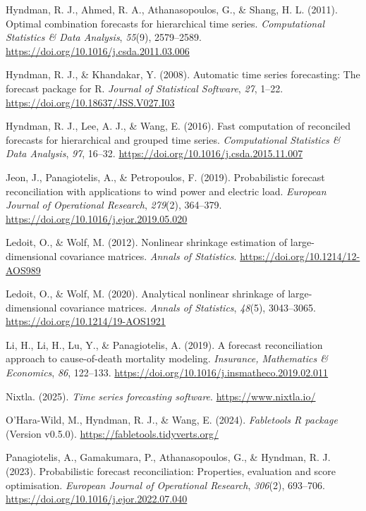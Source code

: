\documentclass[
  11pt,
  letterpaper,
  DIV=11,
  numbers=noendperiod,
  titlepage]{scrartcl}
\newlength{\cslhangindent}
\newenvironment{CSLReferences}[2] %
 {\begin{list}{}{%
  \setlength{\itemindent}{0pt}
  \setlength{\leftmargin}{0pt}
  \setlength{\parsep}{0pt}
  \ifodd #1
   \setlength{\leftmargin}{\cslhangindent}
   \setlength{\itemindent}{-1\cslhangindent}
  \fi
  \setlength{\itemsep}{#2\baselineskip}}}
 {\end{list}}
\begin{document}
\begin{CSLReferences}{1}{0}
Hyndman, R. J., Ahmed, R. A., Athanasopoulos, G., \& Shang, H. L.
(2011). Optimal combination forecasts for hierarchical time series.
\emph{Computational Statistics \& Data Analysis}, \emph{55}(9),
2579--2589. \url{https://doi.org/10.1016/j.csda.2011.03.006}

Hyndman, R. J., \& Khandakar, Y. (2008). Automatic time series
forecasting: The forecast package for {R}. \emph{Journal of Statistical
Software}, \emph{27}, 1--22. \url{https://doi.org/10.18637/JSS.V027.I03}

Hyndman, R. J., Lee, A. J., \& Wang, E. (2016). Fast computation of
reconciled forecasts for hierarchical and grouped time series.
\emph{Computational Statistics \& Data Analysis}, \emph{97}, 16--32.
\url{https://doi.org/10.1016/j.csda.2015.11.007}

Jeon, J., Panagiotelis, A., \& Petropoulos, F. (2019). Probabilistic
forecast reconciliation with applications to wind power and electric
load. \emph{European Journal of Operational Research}, \emph{279}(2),
364--379. \url{https://doi.org/10.1016/j.ejor.2019.05.020}

Ledoit, O., \& Wolf, M. (2012). Nonlinear shrinkage estimation of
large-dimensional covariance matrices. \emph{Annals of Statistics}.
\url{https://doi.org/10.1214/12-AOS989}

Ledoit, O., \& Wolf, M. (2020). Analytical nonlinear shrinkage of
large-dimensional covariance matrices. \emph{Annals of Statistics},
\emph{48}(5), 3043--3065. \url{https://doi.org/10.1214/19-AOS1921}

Li, H., Li, H., Lu, Y., \& Panagiotelis, A. (2019). A forecast
reconciliation approach to cause-of-death mortality modeling.
\emph{Insurance, Mathematics \& Economics}, \emph{86}, 122--133.
\url{https://doi.org/10.1016/j.insmatheco.2019.02.011}

Nixtla. (2025). \emph{Time series forecasting software}.
\url{https://www.nixtla.io/}

O'Hara-Wild, M., Hyndman, R. J., \& Wang, E. (2024). \emph{Fabletools
{R} package} (Version v0.5.0). \url{https://fabletools.tidyverts.org/}

Panagiotelis, A., Gamakumara, P., Athanasopoulos, G., \& Hyndman, R. J.
(2023). Probabilistic forecast reconciliation: Properties, evaluation
and score optimisation. \emph{European Journal of Operational Research},
\emph{306}(2), 693--706.
\url{https://doi.org/10.1016/j.ejor.2022.07.040}


\end{CSLReferences}
\end{document}
